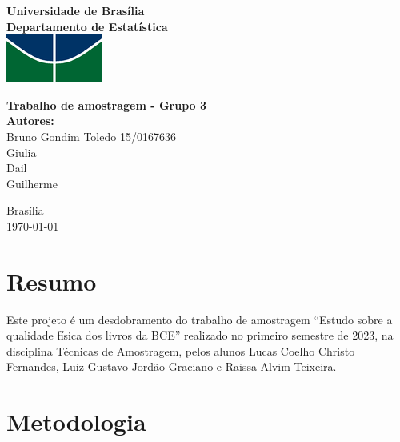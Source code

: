 \documentclass[a4paper, 12pt]{article}
\begin{document}
\begin{titlepage}
\begin{center}
\textbf{\LARGE Universidade de Brasília}\\[0.5cm] 
\textbf{\large Departamento de Estatística}\\[0.2cm]
\vspace{20pt}
\includegraphics{Logo_UnB.png}\\[1cm]

\par
\vspace{32pt}
\textbf{\LARGE Trabalho de amostragem - Grupo 3}\\
\vspace{30pt}
\textbf {\Large Autores:}\\[0.2cm]
\Large {Bruno Gondim Toledo	15/0167636}\\[0.1cm]
\Large {Giulia}\\[0.1cm]
\Large {Dail}\\[0.1cm]
\Large {Guilherme}\\[0.1cm]

\end{center}

\par
\vfill
\begin{center}
{{\normalsize Brasília}\\
{\normalsize \today}}
\end{center}
\end{titlepage}

\newpage
\tableofcontents
\thispagestyle{empty}

\newpage
\section{Resumo}

Este projeto é um desdobramento do trabalho de amostragem “Estudo sobre a qualidade física dos livros da BCE” realizado no primeiro semestre de 2023, na disciplina Técnicas de Amostragem, pelos alunos Lucas Coelho Christo Fernandes, Luiz Gustavo Jordão Graciano e Raissa Alvim Teixeira.


\section{Metodologia}
\end{document}
